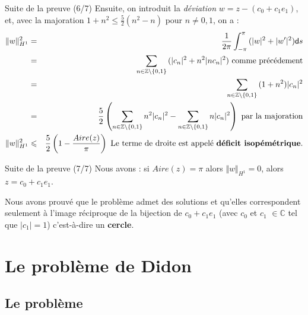 \documentclass[11pt,envcountsect,aspectratio=169]{beamer} %
\newcommand{\Z}{\mathbb{Z}}
\renewcommand{\d}{\mathsf{d}}
\renewcommand{\ss}{\vspace*{\baselineskip}}
\begin{document}
\begin{frame}{Suite de la preuve (6/7)}
    Ensuite, on introduit la \emph{déviation} $w=z-(c_0+c_1e_1)$, et, avec la majoration $1+n^2\leqslant \frac{5}{2}(n^2-n)$ pour $n\neq 0,1$, on a :
    \begin{eqnarray*}
    \Vert w\Vert_{H^1}^2 &=& \frac{1}{2\pi} \int_{-\pi}^{\pi}{ (|w|^2+|w'|^2)\d s} \\
    &=& \sum_{n\in \Z\backslash \{0,1\}}{(|c_n|^2+ n^2|nc_n|^2)} \text{ comme précédement} \\
    &=& \sum_{n\in \Z\backslash \{0,1\}}{(1+n^2) |c_n|^2 } \\
    &=& \frac{5}{2} \left( \sum_{n\in \Z\backslash \{0,1\}}{n^2|c_n|^2} - \sum_{n\in \Z\backslash \{0,1\}}{n|c_n|^2} \right) \text{ par la majoration} \\
    \Vert w\Vert_{H^1}^2 &\leqslant& \frac{5}{2} \left(1-\frac{Aire(z)}{\pi}\right) \text{ Le terme de droite est appelé \textbf{déficit isopémétrique}.}
    \end{eqnarray*}
    
\end{frame}

\begin{frame}{Suite de la preuve (7/7)}
    Nous avons : si $Aire(z)=\pi$ alors $\Vert w \Vert_{H^1} = 0$, alors $z=c_0+c_1e_1$.
    \ss
    
    Nous avons prouvé que le problème admet des solutions et qu'elles correspondent seulement à l'image réciproque de la bijection de $c_0+c_1e_1$ (avec $c_0$ et $c_1$ $\in \mathbb{C}$ tel que $|c_1|=1$) c'est-à-dire un \textbf{cercle}.
\end{frame}










\section{Le problème de Didon}


\subsection{Le problème}
\end{document}

